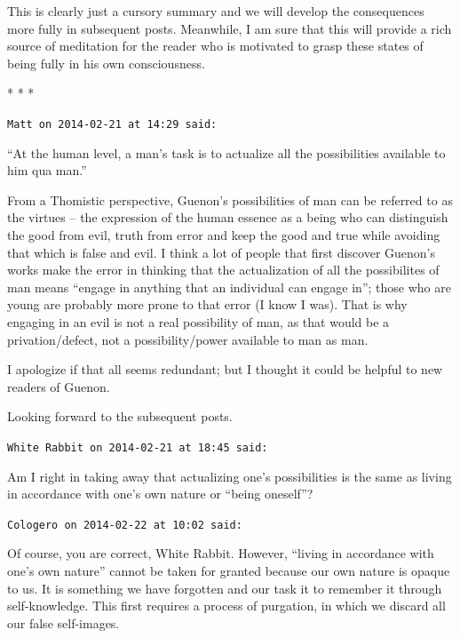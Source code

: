 This is clearly just a cursory summary and we will develop the consequences more fully in subsequent posts. Meanwhile, I am sure that this will provide a rich source of meditation for the reader who is motivated to grasp these states of being fully in his own consciousness.


\begin{center}* * *\end{center}

\begin{footnotesize}
\begin{sffamily}
\texttt{Matt on 2014-02-21 at 14:29 said:}

``At the human level, a man's task is to actualize all the possibilities available to him qua man.''

From a Thomistic perspective, Guenon's possibilities of man can be referred to as the virtues -- the expression of the human essence as a being who can distinguish the good from evil, truth from error and keep the good and true while avoiding that which is false and evil. I think a lot of people that first discover Guenon's works make the error in thinking that the actualization of all the possibilites of man means ``engage in anything that an individual can engage in''; those who are young are probably more prone to that error (I know I was). That is why engaging in an evil is not a real possibility of man, as that would be a privation/defect, not a possibility/power available to man as man.

I apologize if that all seems redundant; but I thought it could be helpful to new readers of Guenon.

Looking forward to the subsequent posts.

\hfill

\texttt{White Rabbit on 2014-02-21 at 18:45 said:}

Am I right in taking away that actualizing one's possibilities is the same as living in accordance with one's own nature or ``being oneself''?

\hfill

\texttt{Cologero on 2014-02-22 at 10:02 said:}

Of course, you are correct, White Rabbit. However, ``living in accordance with one's own nature'' cannot be taken for granted because our own nature is opaque to us. It is something we have forgotten and our task it to remember it through self-knowledge. This first requires a process of purgation, in which we discard all our false self-images.


\end{sffamily}
\end{footnotesize}
